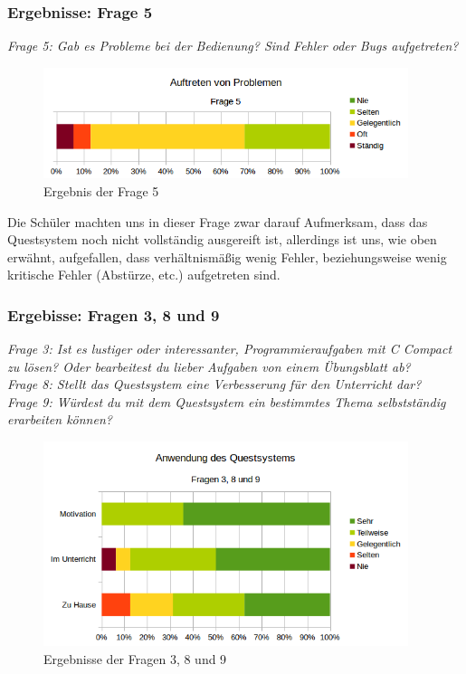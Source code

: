 \subsubsection*{Ergebnisse: Frage 5}

\emph{Frage 5: Gab es Probleme bei der Bedienung? Sind Fehler oder Bugs aufgetreten?}

\begin{figure}[h!]
\centering
\includegraphics[width=0.95\textwidth]{./media/images/gui/trials/quest-f5.png}
\caption{Ergebnis der Frage 5}
\end{figure}

Die Schüler machten uns in dieser Frage zwar darauf Aufmerksam, dass das Questsystem noch nicht vollständig ausgereift ist, allerdings ist uns, wie oben erwähnt, aufgefallen, dass verhältnismäßig wenig Fehler, beziehungsweise wenig kritische Fehler (Abstürze, etc.) aufgetreten sind.

\subsubsection*{Ergebisse: Fragen 3, 8 und 9}

\emph{Frage 3: Ist es lustiger oder interessanter, Programmieraufgaben mit C Compact zu lösen?
Oder bearbeitest du lieber Aufgaben von einem Übungsblatt ab? \\
Frage 8: Stellt das Questsystem eine Verbesserung für den Unterricht dar? \\
Frage 9: Würdest du mit dem Questsystem ein bestimmtes Thema selbstständig erarbeiten können?}

\begin{figure}[h!]
\centering
\includegraphics[width=0.95\textwidth]{./media/images/gui/trials/quest-f3-8-9.png}
\caption{Ergebnisse der Fragen 3, 8 und 9}
\label{fig:sci-quest-f3-8-9}
\end{figure}

